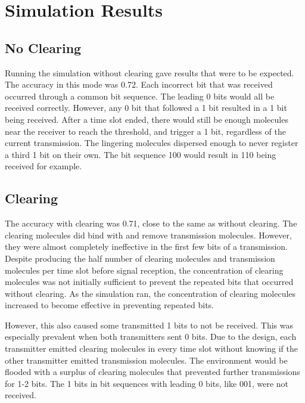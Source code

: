 \documentclass[conference]{IEEEtran}
\begin{document}
\section{Simulation Results}

\subsection{No Clearing}
Running the simulation without clearing gave results that were to be expected. The accuracy in this mode was 0.72. Each incorrect bit that was received occurred through a common bit sequence. The leading 0 bits would all be received correctly. However, any 0 bit that followed a 1 bit resulted in a 1 bit being received. After a time slot ended, there would still be enough molecules near the receiver to reach the threshold, and trigger a 1 bit, regardless of the current transmission. The lingering molecules dispersed enough to never register a third 1 bit on their own. The bit sequence 100 would result in 110 being received for example.

\subsection{Clearing}

The accuracy with clearing was 0.71, close to the same as without clearing. The clearing molecules did bind with and remove transmission molecules. However, they were almost completely ineffective in the first few bits of a transmission. Despite producing the half number of clearing molecules and transmission molecules per time slot before signal reception, the concentration of clearing molecules was not initially sufficient to prevent the repeated bits that occurred without clearing. As the simulation ran, the concentration of clearing molecules increased to become effective in preventing repeated bits.
\\
\par
However, this also caused some transmitted 1 bits to not be received. This was especially prevalent when both transmitters sent 0 bits. Due to the design, each transmitter emitted clearing molecules in every time slot without knowing if the other transmitter emitted transmission molecules. The environment would be flooded with a surplus of clearing molecules that prevented further transmissions for 1-2 bits. The 1 bits in bit sequences with leading 0 bits, like 001, were not received.
\end{document}
